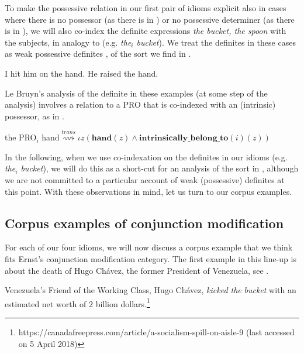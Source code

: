 \documentclass[output=paper]{langsci/langscibook}
\begin{document}
To make the possessive relation in our first pair of idioms explicit also in cases where there is no possessor (as there is in ) or no possessive determiner (as there is in ), we will also co-index the definite expressions \textit{the bucket, the spoon} with the subjects, in analogy to  (e.g. \textit{the$_i$ bucket}). We treat the definites in these cases as weak possessive definites \citep[in the sense of][]{poesio94, barker05}, of the sort we find in  \citep[from][]{lebruyn14}.

\ea\label{weakdef}
\ea
I hit him on the hand.
\ex	
He raised the hand.
\z
\z

\noindent Le Bruyn's analysis of the definite in these examples (at some step of the analysis) involves a relation to a PRO that is co-indexed with an (intrinsic) possessor, as in  \citep[adapted from][324]{lebruyn14}.

\ea	the PRO$_i$ hand\quad $\stackrel{trans}{\rightsquigarrow}$\quad $\iota z (\textbf{hand}(z) \wedge \textbf{intrinsically\_belong\_to}(i)(z))$\label{thehand}
\z

\noindent In the following, when we use co-indexation on the definites in our idioms (e.g. \textit{the$_i$ bucket}), we will do this as a short-cut for an analysis of the sort in , although we are not committed to a particular account of weak (possessive) definites at this point. With these observations in mind, let us turn to our corpus examples.



\subsection{Corpus examples of conjunction modification} \label{clear cases}

For each of our four idioms, we will now discuss a corpus example that we think fits Ernst's conjunction modification category. The first example in this line-up is about the death of Hugo Ch\'avez, the former President of Venezuela, see .

\ea \label{golden bucket}
Venezuela's Friend of the Working Class, Hugo Ch\'avez, \textit{kicked the} \underline{} \textit{bucket} with an estimated net worth of 2 billion dollars.\footnote{https://canadafreepress.com/article/a-socialism-spill-on-aisle-9 (last accessed on 5 April 2018)}
\z
\end{document}
